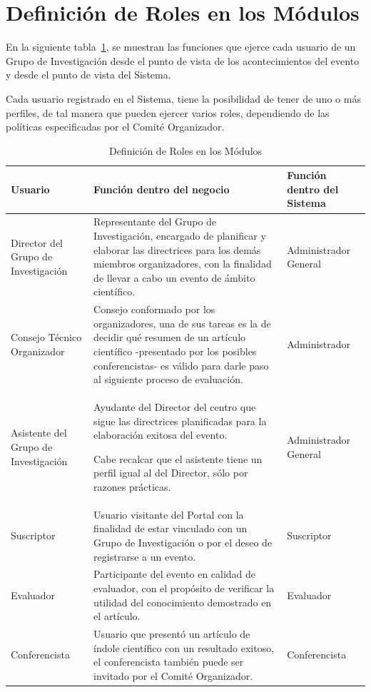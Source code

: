 \section{Definici\'on de Roles en los M\'odulos}
\begin{indentar}
En la siguiente tabla~\ref{usuario:rol}, se muestran las funciones que ejerce cada usuario de un Grupo de Investigaci\'on desde el punto de vista de los acontecimientos del evento y desde el punto de vista del Sistema.

Cada usuario registrado en el Sistema, tiene la posibilidad de tener de uno o m\'as perfiles, de tal manera que pueden ejercer varios roles, dependiendo de las pol\'iticas especificadas por el Comit\'e Organizador.
\begin{table}
	\begin{center}
	\begin{tabular}{|p{1.5in}|p{2.2in}|p{1.5in}|}
		\hline
		\textbf{Usuario} & \textbf{Funci\'on dentro del negocio} & \textbf{Funci\'on dentro del Sistema} \\
		\hline\hline
		Director del Grupo de Investigaci\'on  	& Representante del Grupo de Investigaci\'on, encargado de planificar y elaborar las directrices para los dem\'as miembros organizadores, con la finalidad de llevar a cabo un evento de \'ambito cient\'ifico. & Administrador General \\
		\hline
		Consejo T\'ecnico Organizador		   		& Consejo conformado por los organizadores, una de sus tareas es la de decidir qu\'e resumen de un art\'iculo cient\'ifico -presentado por los posibles conferencistas- es v\'alido para darle paso al siguiente proceso de evaluaci\'on. & Administrador \\
		\hline
		Asistente del Grupo de Investigaci\'on		& Ayudante del Director del centro que sigue las directrices planificadas para la elaboraci\'on exitosa del evento.

Cabe recalcar que el asistente tiene un perfil igual al del Director, s\'olo por razones pr\'acticas. & Administrador General \\
		\hline
		Suscriptor					 						& Usuario visitante del Portal con la finalidad de estar vinculado con un Grupo de Investigaci\'on o por el deseo de registrarse a un evento.  & Suscriptor \\
		\hline
		Evaluador											& Participante del evento en calidad de evaluador, con el prop\'osito de verificar la utilidad del conocimiento demostrado en el art\'iculo. & Evaluador \\
		\hline
		Conferencista										& Usuario que present\'o un art\'iculo de \'indole cient\'ifico con un resultado exitoso, el conferencista tambi\'en puede ser invitado por el Comit\'e Organizador. & Conferencista \\
		\hline
	\end{tabular}
	\caption{Definici\'on de Roles en los M\'odulos}\label{usuario:rol}
	\end{center}
\end{table}
\end{indentar}
